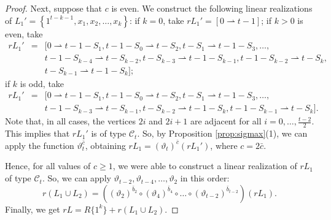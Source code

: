 \documentclass{amsart}
\theoremstyle{definition}
\numberwithin{equation}{section}
\def\C{\mathcal{C}}
\def\su{ \rightharpoonup}
\def\giu{\rightharpoonup}
\def\th{\vartheta}
\begin{document}
\begin{proof}
Next, suppose that $c$ is even. We construct the following linear realizations of $L_1'=\left\{1^{t-k-1}, x_1,x_2,
\ldots, x_k\right\}$:
if $k=0$, take $r L_1' =[0\su t-1]$;
if $k>0$ is even, take
$$\begin{array}{rcl}
rL_1'& = & [0\su t-1-S_1,  t-1-S_0\giu t-S_2, t-S_1\su t-1-S_3,\ldots, \\
&& t-1-S_{k-4} \giu t- S_{k-2}, t-S_{k-3}\su t-1-S_{k-1},
t-1-S_{k-2}\giu t-S_k, \\
&& t-S_{k-1}\su t-1-S_k];
\end{array}$$
if $k$ is odd, take
$$\begin{array}{rcl}
rL_1'& = & [0\su t-1-S_1,  t-1-S_0\giu t-S_2, t-S_1\su t-1-S_3,\ldots, \\
&& t-1-S_{k-3} \giu t- S_{k-1}, t-S_{k-2}\su t-1-S_{k},
t-1-S_{k-1}\giu t-S_k].
\end{array}$$
Note that, in all cases, the vertices $2i$ and $2i+1$ are adjacent for all $i=0,\ldots,\frac{t-2}{2}$.
This implies that $rL_1'$ is of type $\C_t$. So, by Proposition \ref{prop:sigmax}(1), we can apply the function $\vartheta_t^{\bar c}$,
obtaining
$rL_1=(\th_t)^{\bar c}(rL_1')$, where $c=2\bar c$.

Hence, for all values of $c\geq 1$, we were able to construct a linear realization of $rL_1$ of type $\C_t$.
So, we can apply $\th_{t-2}, \th_{t-4},\ldots,\th_2$ in this order:
$$ r(L_1\cup L_2)  = ((\th_{2})^{\bar b_2} \circ (\th_{4})^{\bar b_4}\circ \ldots\circ
(\th_{t-2})^{\bar b_{t-2}})(rL_1).$$
Finally, we get $rL=R\{1^k\}+r(L_1\cup L_2)$.
\end{proof}
\end{document}
